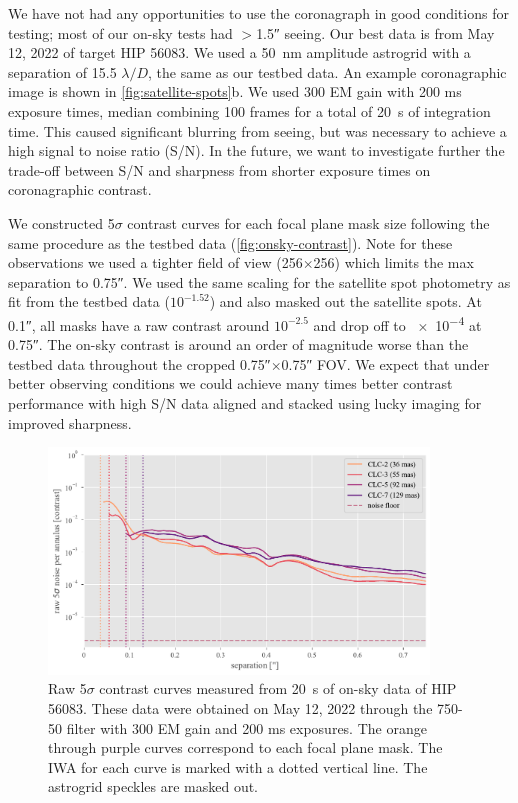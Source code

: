 \documentclass[]{spie}  %
\begin{document}
We have not had any opportunities to use the coronagraph in good conditions for testing; most of our on-sky tests had $>$\ang{;;1.5} seeing. Our best data is from May 12, 2022 of target HIP 56083. We used a \qty{50}{\nano\meter} amplitude astrogrid with a separation of 15.5 $\lambda/D$, the same as our testbed data. An example coronagraphic image is shown in \autoref{fig:satellite-spots}b. We used 300 EM gain with 200 ms exposure times, median combining 100 frames for a total of \qty{20}{\second} of integration time. This caused significant blurring from seeing, but was necessary to achieve a high signal to noise ratio (S/N). In the future, we want to investigate further the trade-off between S/N and sharpness from shorter exposure times on coronagraphic contrast.

We constructed 5$\sigma$ contrast curves for each focal plane mask size following the same procedure as the testbed data (\autoref{fig:onsky-contrast}). Note for these observations we used a tighter field of view (256$\times$256) which limits the max separation to \ang{;;0.75}. We used the same scaling for the satellite spot photometry as fit from the testbed data ($10^{-1.52}$) and also masked out the satellite spots. At \ang{;;0.1}, all masks have a raw contrast around $10^{-2.5}$ and drop off to \num{e-4} at \ang{;;0.75}. The on-sky contrast is around an order of magnitude worse than the testbed data throughout the cropped \ang{;;0.75}$\times$\ang{;;0.75} FOV. We expect that under better observing conditions we could achieve many times better contrast performance with high S/N data aligned and stacked using lucky imaging for improved sharpness.

\begin{figure}
   \centering
   \includegraphics[width=0.9\textwidth]{figures/HIP56083_20220512_curves}
   \caption{Raw 5$\sigma$ contrast curves measured from \qty{20}{\second} of on-sky data of HIP 56083. These data were obtained on May 12, 2022 through the 750-50 filter with 300 EM gain and 200 ms exposures. The orange through purple curves correspond to each focal plane mask. The IWA for each curve is marked with a dotted vertical line. The astrogrid speckles are masked out.}\label{fig:onsky-contrast}
\end{figure}
\end{document}
